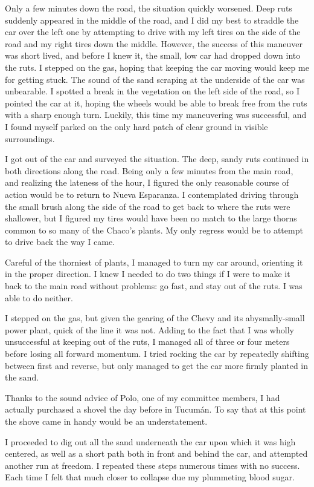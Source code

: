Only a few minutes down the road, the situation quickly worsened. Deep ruts suddenly appeared in the middle of the road, and I did my best to straddle the car over the left one by attempting to drive with my left tires on the side of the road and my right tires down the middle. However, the success of this maneuver was short lived, and before I knew it, the small, low car had dropped down into the ruts. I stepped on the gas, hoping that keeping the car moving would keep me for getting stuck. The sound of the sand scraping at the underside of the car was unbearable. I spotted a break in the vegetation on the left side of the road, so I pointed the car at it, hoping the wheels would be able to break free from the ruts with a sharp enough turn. Luckily, this time my maneuvering was successful, and I found myself parked on the only hard patch of clear ground in visible surroundings.

I got out of the car and surveyed the situation. The deep, sandy ruts continued in both directions along the road. Being only a few minutes from the main road, and realizing the lateness of the hour, I figured the only reasonable course of action would be to return to Nueva Esparanza. I contemplated driving through the small brush along the side of the road to get back to where the ruts were shallower, but I figured my tires would have been no match to the large thorns common to so many of the Chaco’s plants. My only regress would be to attempt to drive back the way I came.

Careful of the thorniest of plants, I managed to turn my car around, orienting it in the proper direction. I knew I needed to do two things if I were to make it back to the main road without problems: go fast, and stay out of the ruts. I was able to do neither.

I stepped on the gas, but given the gearing of the Chevy and its abysmally-small power plant, quick of the line it was not. Adding to the fact that I was wholly unsuccessful at keeping out of the ruts, I managed all of three or four meters before losing all forward momentum. I tried rocking the car by repeatedly shifting between first and reverse, but only managed to get the car more firmly planted in the sand.

Thanks to the sound advice of Polo, one of my committee members, I had actually purchased a shovel the day before in Tucumán. To say that at this point the shove came in handy would be an understatement.

I proceeded to dig out all the sand underneath the car upon which it was high centered, as well as a short path both in front and behind the car, and attempted another run at freedom. I repeated these steps numerous times with no success. Each time I felt that much closer to collapse due my plummeting blood sugar.

